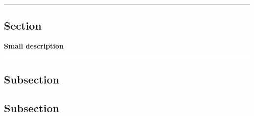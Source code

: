 {\color{gray}\hrule}
\begin{center}
\section{Section}
\textbf{Small description}
\bigskip
\end{center}
{\color{gray}\hrule}
\subsection{Subsection}
\lipsum[1]
\subsection{Subsection}
\lipsum[1-3]
